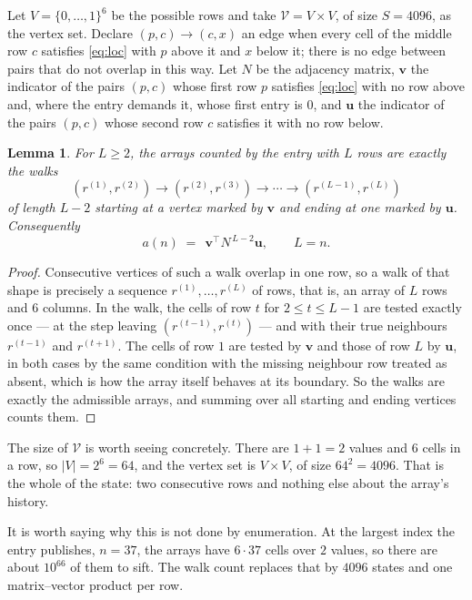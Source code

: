 \documentclass[11pt,a4paper]{article}
\theoremstyle{plain}
\newtheorem{lemma}[theorem]{Lemma}
\theoremstyle{definition}
\begin{document}
Let $V=\{0,\dots,1\}^{6}$ be the possible rows and take
$\mathcal V=V\times V$, of size $S=4096$, as the vertex set. Declare $(p,c)\to(c,x)$ an edge
when every cell of the middle row $c$ satisfies \eqref{eq:loc} with $p$ above it and $x$
below it; there is no edge between pairs that do not overlap in this way. Let $N$ be the
adjacency matrix, $\mathbf{v}$ the indicator of the pairs $(p,c)$ whose first row $p$
satisfies \eqref{eq:loc} with no row above and, where the entry demands it, whose first entry is $0$, and $\mathbf{u}$ the indicator of
the pairs $(p,c)$ whose second row $c$ satisfies it with no row below.

\begin{lemma}\label{lem:walk}
For $L\ge2$, the arrays counted by the entry with $L$ rows are exactly the walks
\[
(r^{(1)},r^{(2)})\to(r^{(2)},r^{(3)})\to\cdots\to(r^{(L-1)},r^{(L)})
\]
of length $L-2$ starting at a vertex marked by $\mathbf{v}$ and ending at one marked by
$\mathbf{u}$. Consequently
\[
a(n)\;=\;\,\mathbf{v}^{\!\top}N^{\,L-2}\mathbf{u},\qquad L=n .
\]
\end{lemma}

\begin{proof}
Consecutive vertices of such a walk overlap in one row, so a walk of that shape is
precisely a sequence $r^{(1)},\dots,r^{(L)}$ of rows, that is, an array of $L$ rows
and $6$ columns. In the walk, the cells of row $t$ for $2\le t\le L-1$ are tested
exactly once --- at the step leaving $(r^{(t-1)},r^{(t)})$ --- and with their true
neighbours $r^{(t-1)}$ and $r^{(t+1)}$. The cells of row $1$ are tested by
$\mathbf{v}$ and those of row $L$ by $\mathbf{u}$, in both cases by the same condition
with the missing neighbour row treated as absent, which is how the array itself behaves at
its boundary. So the walks are exactly the admissible arrays, and summing over all starting
and ending vertices counts them.
\end{proof}


The size of $\mathcal V$ is worth seeing concretely. There are $1+1=2$ values
and $6$ cells in a row, so $|V|=2^{6}=64$, and the vertex set is
$V\times V$, of size $64^2=4096$. That is the whole of the state: two consecutive
rows and nothing else about the array's history.

It is worth saying why this is not done by enumeration. At the largest index the entry
publishes, $n=37$, the arrays have $6\cdot37$ cells over
$2$ values, so there are about $10^{66}$ of them to sift. The
walk count replaces that by $4096$ states and one matrix--vector product per row.
\end{document}
